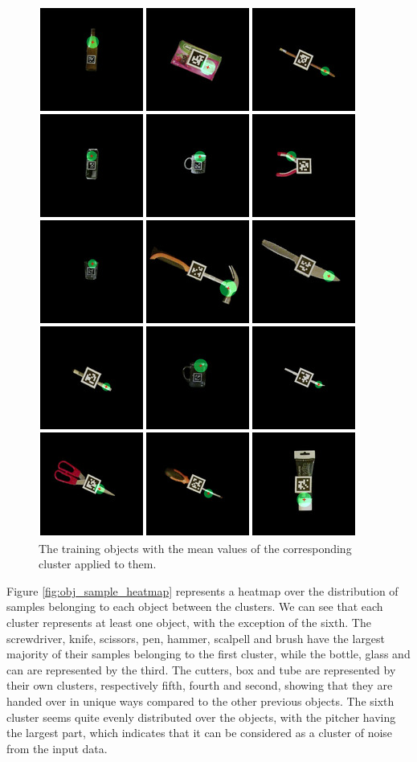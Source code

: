 \begin{figure}
	\centering
	\includegraphics[width=\textwidth]{img/results/objects.jpg}
	\caption{The training objects with the mean values of the corresponding cluster applied to them.}
	\label{fig:results_objects}
\end{figure}

Figure \ref{fig:obj_sample_heatmap} represents a heatmap over the distribution of samples belonging to each object between the clusters. We can see that each cluster represents at least one object, with the exception of the sixth. The screwdriver, knife, scissors, pen, hammer, scalpell and brush have the largest majority of their samples belonging to the first cluster, while the bottle, glass and can are represented by the third. The cutters, box and tube are represented by their own clusters, respectively fifth, fourth and second, showing that they are handed over in unique ways compared to the other previous objects. The sixth cluster seems quite evenly distributed over the objects, with the pitcher having the largest part, which indicates that it can be considered as a cluster of noise from the input data.

